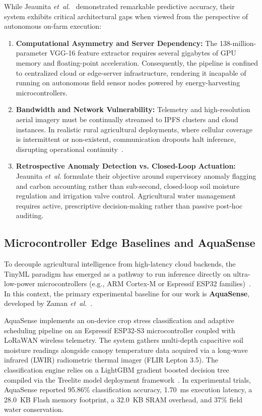 While Jeaunita \textit{et~al.}~\cite{jeaunita2025multitask} demonstrated remarkable predictive accuracy, their system exhibits critical architectural gaps when viewed from the perspective of autonomous on-farm execution:
\begin{enumerate}
    \item \textbf{Computational Asymmetry and Server Dependency:} The 138-million-parameter VGG-16 feature extractor requires several gigabytes of GPU memory and floating-point acceleration. Consequently, the pipeline is confined to centralized cloud or edge-server infrastructure, rendering it incapable of running on autonomous field sensor nodes powered by energy-harvesting microcontrollers.
    \item \textbf{Bandwidth and Network Vulnerability:} Telemetry and high-resolution aerial imagery must be continually streamed to IPFS clusters and cloud instances. In realistic rural agricultural deployments, where cellular coverage is intermittent or non-existent, communication dropouts halt inference, disrupting operational continuity~\cite{olatinwo2025review}.
    \item \textbf{Retrospective Anomaly Detection vs. Closed-Loop Actuation:} Jeaunita \textit{et~al.} formulate their objective around supervisory anomaly flagging and carbon accounting rather than sub-second, closed-loop soil moisture regulation and irrigation valve control. Agricultural water management requires active, prescriptive decision-making rather than passive post-hoc auditing.
\end{enumerate}

\subsection{Microcontroller Edge Baselines and AquaSense}

To decouple agricultural intelligence from high-latency cloud backends, the TinyML paradigm has emerged as a pathway to run inference directly on ultra-low-power microcontrollers (e.g., ARM Cortex-M or Espressif ESP32 families)~\cite{banbury2021benchmarking, lin2020mcunet}. In this context, the primary experimental baseline for our work is \textbf{AquaSense}, developed by Zaman \textit{et~al.}~\cite{zaman2026aquasense}.

AquaSense implements an on-device crop stress classification and adaptive scheduling pipeline on an Espressif ESP32-S3 microcontroller coupled with LoRaWAN wireless telemetry. The system gathers multi-depth capacitive soil moisture readings alongside canopy temperature data acquired via a long-wave infrared (LWIR) radiometric thermal imager (FLIR Lepton 3.5). The classification engine relies on a LightGBM gradient boosted decision tree compiled via the Treelite model deployment framework~\cite{cho2018treelite, ke2017lightgbm}. In experimental trials, AquaSense reported 95.86\% classification accuracy, 1.70~ms execution latency, a 28.0~KB Flash memory footprint, a 32.0~KB SRAM overhead, and 37\% field water conservation.

